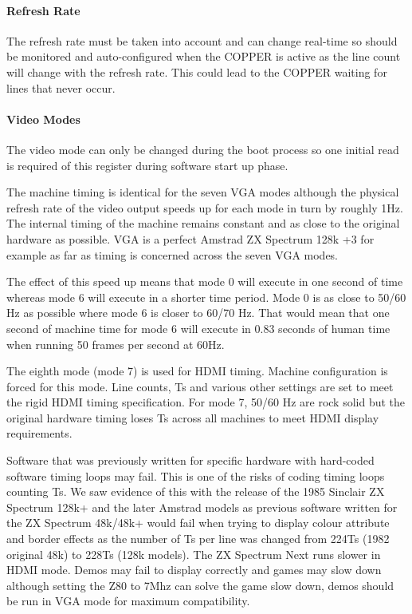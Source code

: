 \paragraph{Refresh Rate}

The refresh rate must be taken into account and can change real-time
so should be monitored and auto-configured when the COPPER is active
as the line count will change with the refresh rate. This could lead
to the COPPER waiting for lines that never occur.



\paragraph{Video Modes}

The video mode can only be changed during the boot process so one
initial read is required of this register during software start up
phase.

The machine timing is identical for the seven VGA modes although the
physical refresh rate of the video output speeds up for each mode in
turn by roughly 1Hz. The internal timing of the machine remains
constant and as close to the original hardware as possible. VGA is a
perfect Amstrad ZX Spectrum 128k +3 for example as far as timing is
concerned across the seven VGA modes.

The effect of this speed up means that mode 0 will execute in one
second of time whereas mode 6 will execute in a shorter time
period. Mode 0 is as close to 50/60 Hz as possible where mode 6 is
closer to 60/70 Hz. That would mean that one second of machine time
for mode 6 will execute in 0.83 seconds of human time when running 50
frames per second at 60Hz.

The eighth mode (mode 7) is used for HDMI timing. Machine
configuration is forced for this mode. Line counts, Ts and various
other settings are set to meet the rigid HDMI timing
specification. For mode 7, 50/60 Hz are rock solid but the original
hardware timing loses Ts across all machines to meet HDMI display
requirements.

Software that was previously written for specific hardware with
hard-coded software timing loops may fail. This is one of the risks of
coding timing loops counting Ts. We saw evidence of this with the
release of the 1985 Sinclair ZX Spectrum 128k+ and the later Amstrad
models as previous software written for the ZX Spectrum 48k/48k+ would
fail when trying to display colour attribute and border effects as the
number of Ts per line was changed from 224Ts (1982 original 48k) to
228Ts (128k models). The ZX Spectrum Next runs slower in HDMI
mode. Demos may fail to display correctly and games may slow down
although setting the Z80 to 7Mhz can solve the game slow down, demos
should be run in VGA mode for maximum compatibility.

